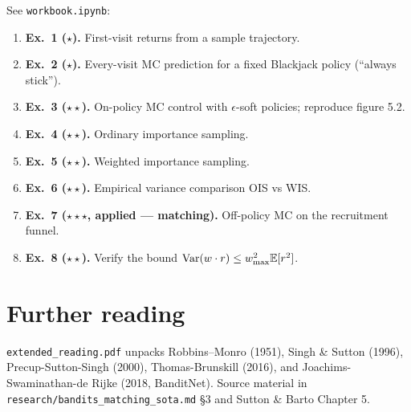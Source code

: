 \documentclass[11pt,oneside]{scrbook}
\begin{document}
See \texttt{workbook.ipynb}:
\begin{enumerate}[label={},leftmargin=0pt,labelsep=0pt]\setlength\itemsep{2pt}
  \item \textbf{Ex.\ 1 ($\star$).} First-visit returns from a sample
        trajectory.
  \item \textbf{Ex.\ 2 ($\star$).} Every-visit MC prediction for a fixed
        Blackjack policy (``always stick'').
  \item \textbf{Ex.\ 3 ($\star\star$).} On-policy MC control with
        $\epsilon$-soft policies; reproduce figure 5.2.
  \item \textbf{Ex.\ 4 ($\star\star$).} Ordinary importance sampling.
  \item \textbf{Ex.\ 5 ($\star\star$).} Weighted importance sampling.
  \item \textbf{Ex.\ 6 ($\star\star$).} Empirical variance comparison
        OIS vs WIS.
  \item \textbf{Ex.\ 7 ($\star\star\star$, applied --- matching).}
        Off-policy MC on the recruitment funnel.
  \item \textbf{Ex.\ 8 ($\star\star$).} Verify the bound
        $\operatorname{Var}(w\cdot r) \le w_{\max}^2 \mathbb{E}[r^2]$.
\end{enumerate}

\chapter{Further reading}

\texttt{extended\_reading.pdf} unpacks Robbins--Monro (1951), Singh \& Sutton
(1996), Precup-Sutton-Singh (2000), Thomas-Brunskill (2016), and Joachims-
Swaminathan-de Rijke (2018, BanditNet). Source material in
\verb|research/bandits_matching_sota.md| \S 3 and Sutton \& Barto Chapter 5.
\end{document}
